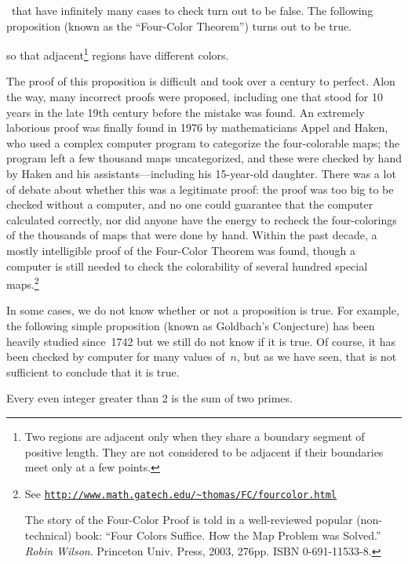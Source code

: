\illegible\  that have infinitely many cases to check turn out to be
false.  The following proposition (known as the ``Four-Color
Theorem'') turns out to be true.
\begin{proposition}\label{4colorprop}
 so that
adjacent\footnote{Two regions are adjacent only when they share a boundary
segment of positive length.  They are not considered to be adjacent if
their boundaries meet only at a few points.} regions have different
colors.
\end{proposition}
The proof of this proposition is difficult and took over a century to
perfect.  Alon the way, many incorrect proofs were proposed,
including one that stood for 10 years in the late 19th century before
the mistake was found.  An extremely laborious proof was finally found
in 1976 by mathematicians Appel and Haken, who used a complex computer
program to categorize the four-colorable maps; the program left a few
thousand maps uncategorized, and these were checked by hand by Haken
and his assistants---including his 15-year-old daughter.  There was a
lot of debate about whether this was a legitimate proof: the proof was
too big to be checked without a computer, and no one could guarantee
that the computer calculated correctly, nor did anyone have the energy
to recheck the four-colorings of the thousands of maps that were done by
hand.  Within the past decade, a mostly intelligible proof of the
Four-Color Theorem was found, though a computer is still needed to
check the colorability of several hundred special maps.\footnote{See
\href{http://www.math.gatech.edu/~thomas/FC/fourcolor.html}
{\texttt{http://www.math.gatech.edu/\~{}thomas/FC/fourcolor.html}}

The story of the Four-Color Proof is told in a well-reviewed
  popular (non-technical) book: ``Four Colors Suffice.  How the Map
  Problem was Solved.'' \emph{Robin Wilson}.  Princeton Univ. Press, 2003,
  276pp. ISBN 0-691-11533-8.}

In some cases, we do not know whether or not a proposition is true.
For example, the following simple proposition (known as Goldbach's
Conjecture) has been heavily studied since~1742 but we still do not
know if it is true.  Of course, it has been checked by computer for
many values of~$n$, but as we have seen, that is not sufficient to
conclude that it is true.
\begin{proposition}[Goldbach]
Every even integer greater than 2 is the sum of two primes.
\end{proposition}

